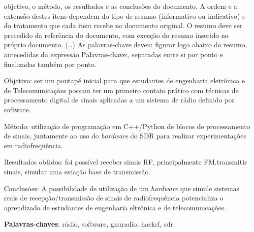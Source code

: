 \documentclass[
  12pt,				%
  openright,			%
  twoside,			%
  a4paper,			%
  english,			%
  french,				%
  spanish,			%
  brazil,				%
  ]{abntex2}
\begin{document}
\setlength{\absparsep}{18pt} %
\begin{resumo}
  objetivo, o método, os resultados e as conclusões do documento. A ordem e a extensão
  destes itens dependem do tipo de resumo (informativo ou indicativo) e do
  tratamento que cada item recebe no documento original. O resumo deve ser
  precedido da referência do documento, com exceção do resumo inserido no
  próprio documento. (\ldots) As palavras-chave devem figurar logo abaixo do
  resumo, antecedidas da expressão Palavras-chave:, separadas entre si por
  ponto e finalizadas também por ponto.

  Objetivo: ser um pontapé inicial para que estudantes de engenharia eletrônica e de Telecomunicações
  possam ter um primeiro contato prático com técnicas de processamento digital de sinais aplicadas a
  um sistema de rádio definido por software.

  Método: utilização de programação em C++/Python de blocos de processamento de sinais, juntamente ao
  uso do \textit{hardware} do SDR para realizar experimentações em radiofrequência.

  Resultados obtidos: foi possível receber sinais RF, principalmente FM,transmitir sinais, simular uma
  estação base de transmissão.

  Conclusões: A possibilidade de utilização de um \textit{hardware} que simule sistemas reais de recepção/transmissão
  de sinais de radiofrequência potencializa o aprendizado de estudantes de engenharia eltrônica e de
  telecomunicações.



  \noindent
  \textbf{Palavras-chaves}: rádio, software, gnuradio, hackrf, sdr.
\end{resumo}

\listoffigures*
\cleardoublepage

\listoftables*
\cleardoublepage
\end{document}
